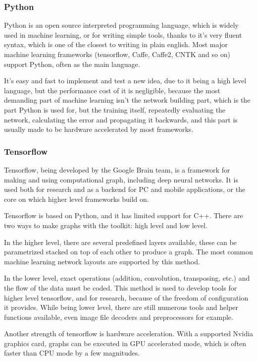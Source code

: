 \documentclass[a4paper]{article}
\begin{document}
\subsubsection{Python}
Python is an open source interpreted programming language, which is widely used in machine learning, or for writing simple tools, thanks to it's very fluent syntax, which is one of the closest to writing in plain english. Most major machine learning frameworks (tensorflow, Caffe, Caffe2, CNTK and so on) support Python, often as the main language.\par
It's easy and fast to implement and test a new idea, due to it being a high level language, but the performance cost of it is negligible, because the most demanding part of machine learning isn't the network building part, which is the part Python is used for, but the training itself, repeatedly evaluating the network, calculating the error and propagating it backwards, and this part is usually made to be hardware accelerated by most frameworks.
\subsubsection{Tensorflow}
Tensorflow, being developed by the Google Brain team, is a framework for making and using computational graph, including deep neural networks. It is used both for research and as a backend for PC and mobile applications, or the core on which higher level frameworks build on.\par
Tensorflow is based on Python, and it has limited support for C++. There are two ways to make graphs with the toolkit: high level and low level.\par
In the higher level, there are several predefined layers available, these can be parametrized stacked on top of each other to produce a graph. The most common machine learning network layouts are supported by this method.\par
In the lower level, exact operations (addition, convolution, transposing, etc.) and the flow of the data must be coded. This method is used to develop tools for higher level tensorflow, and for research, because of the freedom of configuration it provides. While being lower level, there are still numerous tools and helper functions available, even image file decoders and preprocessors for example.\par
Another strength of tensorflow is hardware acceleration. With a supported Nvidia graphics card, graphs can be executed in GPU accelerated mode, which is often faster than CPU mode by a few magnitudes.
\end{document}
